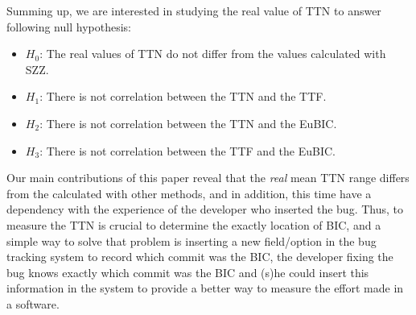 \documentclass[10pt, conference]{IEEEtran}
\begin{document}
Summing up, we are interested in studying the real value of TTN to answer following null hypothesis:
\begin{itemize}
\item $H_0$: The real values of TTN do not differ from the values calculated with SZZ.
\item $H_1$: There is not correlation between the TTN and the TTF.
\item $H_2$: There is not correlation between the TTN and the EuBIC.
\item $H_3$: There is not correlation between the TTF and the EuBIC.
\end{itemize}
Our main contributions of this paper reveal that the \emph{real} mean TTN range differs from the calculated with other methods, and in addition, this time have a dependency with the experience of the developer who inserted the bug. Thus, to measure the TTN is crucial to determine the exactly location of BIC, and a simple way to solve that problem is inserting a new field/option in the bug tracking system to record which commit was the BIC, the developer fixing the bug knows exactly which commit was the BIC and (s)he could insert this information in the system to provide a better way to measure the effort made in a software.
\end{document}
